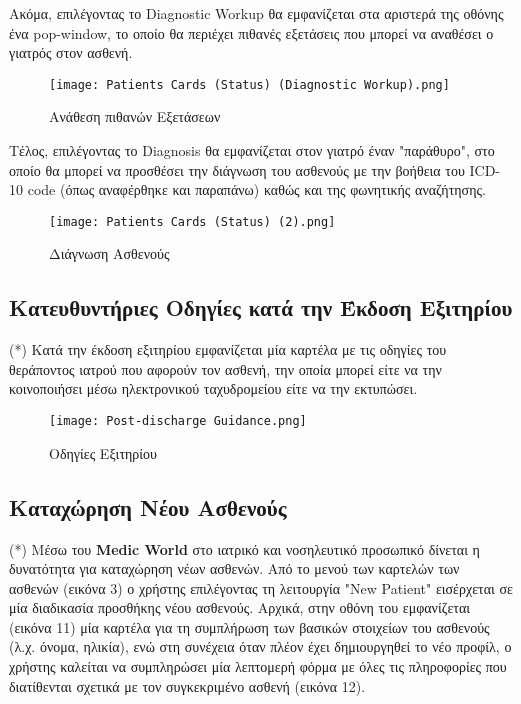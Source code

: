 \documentclass{article}
\begin{document}
\newpage

\par Ακόμα, επιλέγοντας το Diagnostic Workup θα εμφανίζεται στα αριστερά της οθόνης ένα pop-window, το οποίο θα περιέχει πιθανές εξετάσεις που μπορεί να αναθέσει ο γιατρός στον ασθενή.

\begin{figure}[!htb]
\centering
\texttt{[image: Patients Cards (Status) (Diagnostic Workup).png]}
\caption{\label{fig:Diagnostic Workup} Ανάθεση πιθανών Εξετάσεων }
\end{figure}

\vspace{0.3cm}

Τέλος, επιλέγοντας το Diagnosis θα εμφανίζεται στον γιατρό έναν "παράθυρο", στο οποίο θα μπορεί να προσθέσει την διάγνωση του ασθενούς με την βοήθεια του ICD-10 code (όπως αναφέρθηκε και παραπάνω) καθώς και της φωνητικής αναζήτησης.

\vspace{0.3cm}

\begin{figure}[!htb]
\centering
\texttt{[image: Patients Cards (Status) (2).png]}
\caption{\label{fig:Diagnosis} Διάγνωση Ασθενούς }
\end{figure}

\newpage

\subsection{Κατευθυντήριες Οδηγίες κατά την Έκδοση Εξιτηρίου}
(*) Κατά την έκδοση εξιτηρίου εμφανίζεται μία καρτέλα με τις οδηγίες του θεράποντος ιατρού που αφορούν τον ασθενή, την οποία μπορεί είτε να την κοινοποιήσει μέσω ηλεκτρονικού ταχυδρομείου είτε να την εκτυπώσει.

\begin{figure}[!htb]
\centering
\texttt{[image: Post-discharge Guidance.png]}
\caption{\label{fig:discharge guide} Οδηγίες Εξιτηρίου}
\end{figure}

\subsection{Καταχώρηση Νέου Ασθενούς}
(*) Μέσω του \textbf{Medic World} στο ιατρικό και νοσηλευτικό προσωπικό δίνεται η δυνατότητα για καταχώρηση νέων ασθενών. Από το μενού των καρτελών των ασθενών (εικόνα 3) ο χρήστης επιλέγοντας τη λειτουργία "New Patient" εισέρχεται σε μία διαδικασία προσθήκης νέου ασθενούς. Αρχικά, στην οθόνη του εμφανίζεται (εικόνα 11) μία καρτέλα για τη συμπλήρωση των βασικών στοιχείων του ασθενούς (λ.χ. όνομα, ηλικία), ενώ στη συνέχεια όταν πλέον έχει δημιουργηθεί το νέο προφίλ, ο χρήστης καλείται να συμπληρώσει μία λεπτομερή φόρμα με όλες τις πληροφορίες που διατίθενται σχετικά με τον συγκεκριμένο ασθενή (εικόνα 12). 
\end{document}
